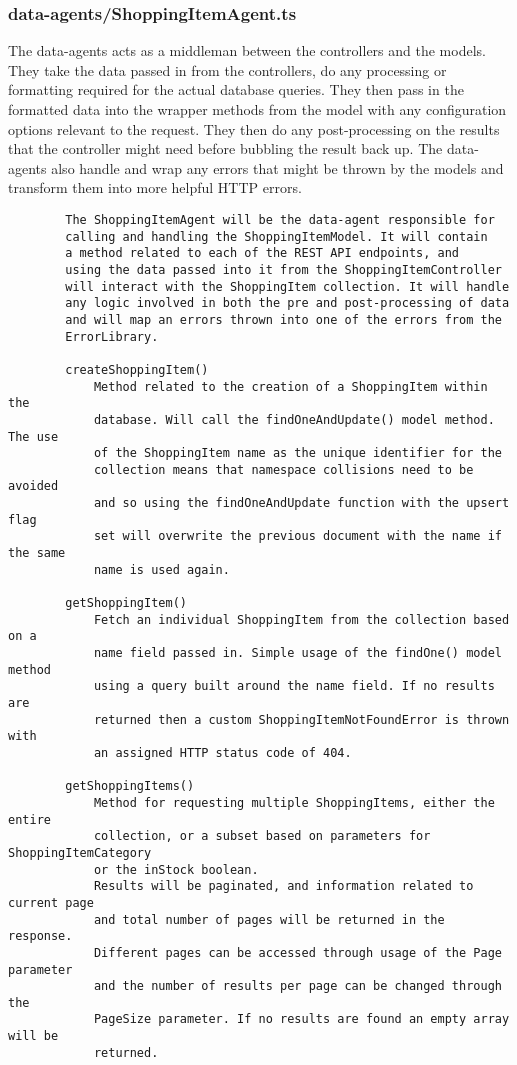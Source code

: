 \subsubsection{data-agents/ShoppingItemAgent.ts}
The data-agents acts as a middleman between the controllers and the models. They take the data passed in from the controllers, do any processing or formatting required for the actual database queries. They then pass in the formatted data into the wrapper methods from the model with any configuration options relevant to the request. They then do any post-processing on the results that the controller might need before bubbling the result back up. The data-agents also handle and wrap any errors that might be thrown by the models and transform them into more helpful HTTP errors.
\begin{verbatim}
        The ShoppingItemAgent will be the data-agent responsible for 
        calling and handling the ShoppingItemModel. It will contain 
        a method related to each of the REST API endpoints, and 
        using the data passed into it from the ShoppingItemController
        will interact with the ShoppingItem collection. It will handle
        any logic involved in both the pre and post-processing of data
        and will map an errors thrown into one of the errors from the 
        ErrorLibrary.
        
        createShoppingItem()
            Method related to the creation of a ShoppingItem within the
            database. Will call the findOneAndUpdate() model method. The use
            of the ShoppingItem name as the unique identifier for the
            collection means that namespace collisions need to be avoided
            and so using the findOneAndUpdate function with the upsert flag
            set will overwrite the previous document with the name if the same
            name is used again.
        
        getShoppingItem()
            Fetch an individual ShoppingItem from the collection based on a
            name field passed in. Simple usage of the findOne() model method
            using a query built around the name field. If no results are 
            returned then a custom ShoppingItemNotFoundError is thrown with 
            an assigned HTTP status code of 404.
        
        getShoppingItems()
            Method for requesting multiple ShoppingItems, either the entire
            collection, or a subset based on parameters for ShoppingItemCategory
            or the inStock boolean.
            Results will be paginated, and information related to current page
            and total number of pages will be returned in the response.
            Different pages can be accessed through usage of the Page parameter 
            and the number of results per page can be changed through the 
            PageSize parameter. If no results are found an empty array will be
            returned. 
        

\end{verbatim}
